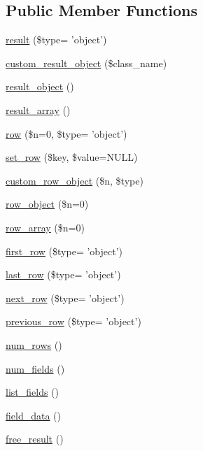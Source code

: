 \subsection*{Public Member Functions}
\begin{DoxyCompactItemize}
\item 
\hyperlink{class_c_i___d_b__result_a00c60026ca0f661ad05ccbea453e2a70}{result} (\$type= 'object')
\item 
\hyperlink{class_c_i___d_b__result_a5ac3523f878efb629fae30a7d9156e77}{custom\-\_\-result\-\_\-object} (\$class\-\_\-name)
\item 
\hyperlink{class_c_i___d_b__result_a266a17f340dab35b8f2858931ff772a2}{result\-\_\-object} ()
\item 
\hyperlink{class_c_i___d_b__result_a444f7dd61bfbe3931a7188adad61feae}{result\-\_\-array} ()
\item 
\hyperlink{class_c_i___d_b__result_ae24a9cbcd70e2e547fbb1465ad35c597}{row} (\$n=0, \$type= 'object')
\item 
\hyperlink{class_c_i___d_b__result_a77628e90fac65184ec9f583e7c30a48a}{set\-\_\-row} (\$key, \$value=N\-U\-L\-L)
\item 
\hyperlink{class_c_i___d_b__result_a223538c34395626655fd483f3a55e653}{custom\-\_\-row\-\_\-object} (\$n, \$type)
\item 
\hyperlink{class_c_i___d_b__result_a0bd3520c57f5cb192bdfaeed1f597c0a}{row\-\_\-object} (\$n=0)
\item 
\hyperlink{class_c_i___d_b__result_a8dbff471ffdaf617d49189f8636e4f81}{row\-\_\-array} (\$n=0)
\item 
\hyperlink{class_c_i___d_b__result_ab17d02e3b1f6d64f9cff8392b90775db}{first\-\_\-row} (\$type= 'object')
\item 
\hyperlink{class_c_i___d_b__result_a40968b12597461279cc2f7b3653d01fb}{last\-\_\-row} (\$type= 'object')
\item 
\hyperlink{class_c_i___d_b__result_a2f889a20a40a759eae8da377a5a7e95d}{next\-\_\-row} (\$type= 'object')
\item 
\hyperlink{class_c_i___d_b__result_a82714fea11fb63d96343d164f3a536b7}{previous\-\_\-row} (\$type= 'object')
\item 
\hyperlink{class_c_i___d_b__result_a218657c303ee499b97710ab0cd2f5d6e}{num\-\_\-rows} ()
\item 
\hyperlink{class_c_i___d_b__result_af831bf363e4d7d661a717a4932af449d}{num\-\_\-fields} ()
\item 
\hyperlink{class_c_i___d_b__result_a50b54eb4ea7cfd039740f532988ea776}{list\-\_\-fields} ()
\item 
\hyperlink{class_c_i___d_b__result_a84bffd65e53902ade1591716749a33e3}{field\-\_\-data} ()
\item 
\hyperlink{class_c_i___d_b__result_aad2d98d6beb3d6095405356c6107b473}{free\-\_\-result} ()
\end{DoxyCompactItemize}
